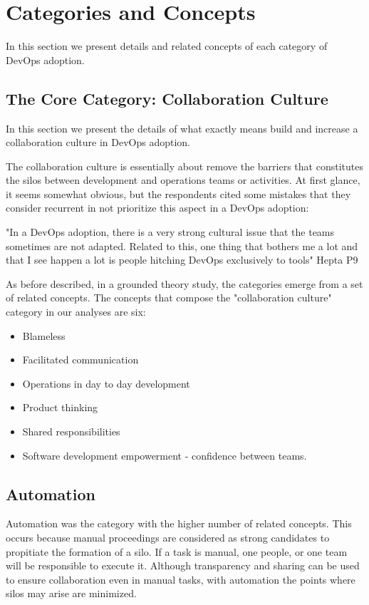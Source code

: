 \section{Categories and Concepts}
In this section we present details and related concepts of each category of DevOps adoption.

\subsection{The Core Category: Collaboration Culture}
In this section we present the details of what exactly means build and increase a collaboration culture in DevOps adoption.

The collaboration culture is essentially about remove the barriers that constitutes the silos between development and operations teams or activities. At first glance, it seems somewhat obvious, but the respondents cited some mistakes that they consider recurrent in not prioritize this aspect in a DevOps adoption:

"In a DevOps adoption, there is a very strong cultural issue that the teams sometimes are not adapted. Related to this, one thing that bothers me a lot and that I see happen a lot is people hitching DevOps exclusively to tools" Hepta P9

As before described, in a grounded theory study, the categories emerge from a set of related concepts. The concepts that compose the "collaboration culture" category in our analyses are six:

\begin{itemize}
\item Blameless
\item Facilitated communication
\item Operations in day to day development
\item Product thinking
\item Shared responsibilities
\item Software development empowerment - confidence between teams.
\end{itemize}

\subsection{Automation} \label{ssec:automation}
Automation was the category with the higher number of related concepts. This occurs because manual proceedings are considered as strong candidates to propitiate the formation of a silo. If a task is manual, one people, or one team will be responsible to execute it. Although transparency and sharing can be used to ensure collaboration even in manual tasks, with automation the points where silos may arise are minimized.


